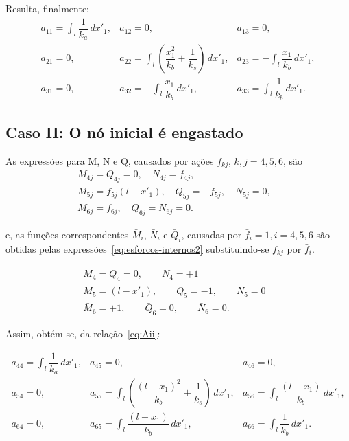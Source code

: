Resulta, finalmente:
\begin{equation*}
	\label{eq:coeficientes_Aii}
	\begin{array}{ccc}
		a_{11} = \int_l \dfrac{1}{k_a}\,dx'_1, & a_{12} = 0,                                                                & a_{13} = 0,                                \\
		a_{21} = 0,                            & a_{22} = \int_l \left( \dfrac{x_1^2}{k_b} + \dfrac{1}{k_s} \right)\,dx'_1, & a_{23} = -\int_l \dfrac{x_1}{k_b} \,dx'_1, \\
		a_{31} = 0,                            & a_{32} = -\int_l \dfrac{x_1}{k_b} \,dx'_1,                                 & a_{33} = \int_l \dfrac{1}{k_b}\,dx'_1.
	\end{array}
\end{equation*}

\subsection*{Caso II: O nó inicial é engastado}

As expressões para M, N e Q, causados por ações $f_{kj}$, $k,j=4,5,6$, são
\begin{align}
	\label{eq:esforcos-internos2}
	M_{4j} = Q_{4j} = 0, \quad
	N_{4j} = f_{4j}, \nonumber & \\
	M_{5j} = f_{5j}(l-x'_1), \quad
	Q_{5j} = -f_{5j}, \quad
	N_{5j} = 0, \nonumber      & \\
	M_{6j} = f_{6j}, \quad
	Q_{6j}=N_{6j}=0.
\end{align}

e, as funções correspondentes $\bar{M}_i$, $\bar{N}_i$ e $\bar{Q}_i$, causadas por $\bar{f}_i=1,i=4,5,6$ são obtidas pelas expressões~\ref{eq:esforcos-internos2} substituindo-se $f_{kj}$ por $\bar{f}_i$.

\begin{align}
	\bar{M}_4=\bar{Q}_4 = 0, \qquad
	\bar{N}_4 = +1 \nonumber & \\
	\bar{M}_5 = (l-x'_1), \qquad
	\bar{Q}_5 = -1, \qquad
	\bar{N}_5 = 0  \nonumber & \\
	\bar{M}_6 = +1, \qquad
	\bar{Q}_6=0,  \qquad
	\bar{N}_6=0.
\end{align}

Assim, obtém-se, da relação~\ref{eq:Aii}:

\begin{equation}
	\label{eq:coeficientes_Aff}
	\begin{array}{ccc}
		a_{44} = \int_l \dfrac{1}{k_a}\,dx'_1, & a_{45} = 0,                                                                    & a_{46} = 0, \nonumber                                   \\
		a_{54} = 0,                            & a_{55} = \int_l \left( \dfrac{(l-x_1)^2}{k_b} + \dfrac{1}{k_s} \right)\,dx'_1, & a_{56} = \int_l \dfrac{(l-x_1)}{k_b} \,dx'_1, \nonumber \\
		a_{64} = 0,                            & a_{65} = \int_l \dfrac{(l-x_1)}{k_b} \,dx'_1,                                  & a_{66} = \int_l \dfrac{1}{k_b}\,dx'_1.
	\end{array}
\end{equation}


